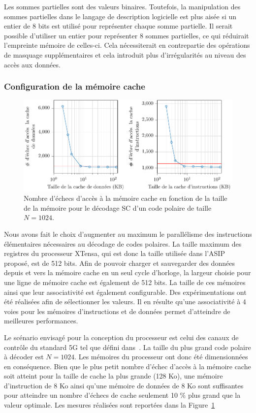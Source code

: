 Les sommes partielles sont des valeurs binaires. Toutefois, la manipulation des sommes partielles dans le langage de description logicielle est plus aisée si un entier de 8 bits est utilisé pour représenter chaque somme partielle. Il serait possible d'utiliser un entier pour représenter 8 sommes partielles, ce qui réduirait l'empreinte mémoire de celles-ci. Cela nécessiterait en contrepartie des opérations de masquage supplémentaires et cela introduit plus d'irrégularités au niveau des accès aux données.

\subsubsection{Configuration de la mémoire cache}
\begin{figure}
\centering
\includegraphics[width=\textwidth]{main/ch3_fig/curves/memory/tikz/memory}
\caption{Nombre d'échecs d'accès à la mémoire cache en fonction de la taille de la mémoire pour le décodage SC d'un code polaire de taille $N=1024$.}
\label{fig:tensilica_mem}
\end{figure}

Nous avons fait le choix d'augmenter au maximum le parallélisme des instructions élémentaires nécessaires au décodage de codes polaires. La taille maximum des registres du processeur XTensa, qui est donc la taille utilisée dans l'ASIP proposé, est de 512 bits. Afin de pouvoir charger et sauvegarder des données depuis et vers la mémoire cache en un seul cycle d'horloge, la largeur choisie pour une ligne de mémoire cache est également de 512 bits. La taille de ces mémoires ainsi que leur associativité est également configurable. Des expérimentations ont été réalisées afin de sélectionner les valeurs. Il en résulte qu'une associativité à 4 voies pour les mémoires d'instructions et de données permet d'atteindre de meilleures performances.

Le scénario envisagé pour la conception du processeur est celui des canaux de contrôle du standard 5G tel que défini dans~\cite{3gpp_ts_2017}. La taille du plus grand code polaire à décoder est $N=1024$. Les mémoires du processeur ont donc été dimensionnées en conséquence.
Bien que le plus petit nombre d'échec d'accès à la mémoire cache soit atteint pour la taille de cache la plus grande (128 Ko), une mémoire d'instruction de 8 Ko ainsi qu'une mémoire de données de 8 Ko sont suffisantes pour atteindre un nombre d'échecs de cache seulement 10 \% plus grand que la valeur optimale. Les mesures réalisées sont reportées dans la Figure~\ref{fig:tensilica_mem}

